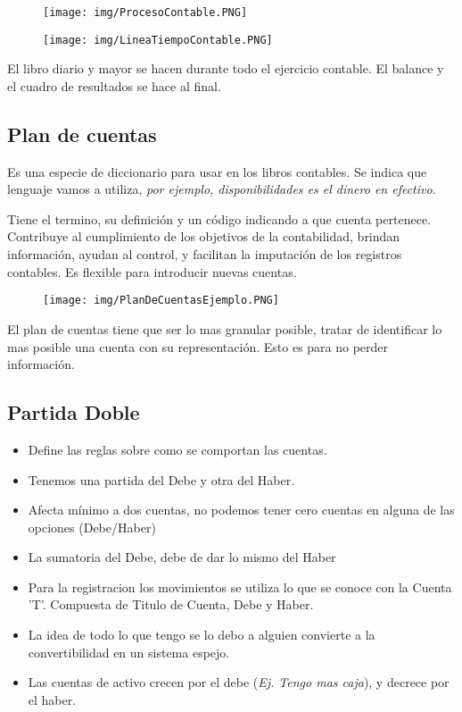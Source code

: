 \documentclass[titlepage,a4paper]{article}
\begin{document}
\begin{figure}[!htb]
    \centering
    \texttt{[image: img/ProcesoContable.PNG]}
\end{figure}

\begin{figure}[!htb]
    \centering
    \texttt{[image: img/LineaTiempoContable.PNG]}
\end{figure}

El libro diario y mayor se hacen durante todo el ejercicio contable. El balance y el cuadro de resultados se hace al final.

\newpage

\subsection{Plan de cuentas}
Es una especie de diccionario para usar en los libros contables. Se indica que lenguaje vamos a utiliza, \textit{por ejemplo, disponibilidades es el dinero en efectivo}. 

Tiene el termino, su definición y un código indicando a que cuenta pertenece.
Contribuye al cumplimiento de los objetivos de la contabilidad, brindan información, ayudan al control, y facilitan la imputación de los registros contables. Es flexible para introducir nuevas cuentas.

\begin{figure}[!htb]
    \centering
    \texttt{[image: img/PlanDeCuentasEjemplo.PNG]}
\end{figure}

El plan de cuentas tiene que ser lo mas granular posible, tratar de identificar lo mas posible una cuenta con su representación. Esto es para no perder información.

\subsection{Partida Doble}
\begin{itemize}
\item Define las reglas sobre como se comportan las cuentas.
\item Tenemos una partida del Debe y otra del Haber.
\item Afecta mínimo a dos cuentas, no podemos tener cero cuentas en alguna de las opciones (Debe/Haber)
\item La sumatoria del Debe, debe de dar lo mismo del Haber
\item Para la registracion los movimientos se utiliza lo que se conoce con la Cuenta 'T'. Compuesta de Titulo de Cuenta,  Debe y Haber.
\item La idea de todo lo que tengo se lo debo a alguien convierte a la convertibilidad en un sistema espejo.
\item Las cuentas de activo crecen por el debe (\textit{Ej. Tengo mas caja}), y decrece por el haber.
\end{itemize}
\end{document}
